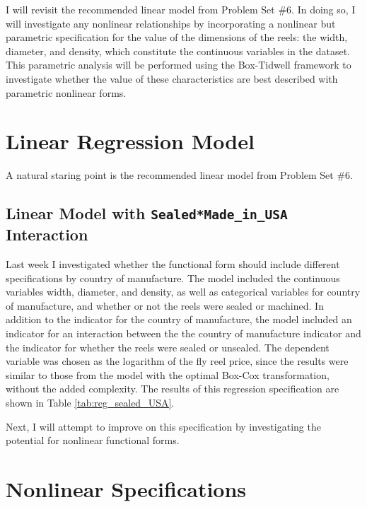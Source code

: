 \documentclass[11pt]{paper}
\begin{document}
I will revisit the recommended linear model
from Problem Set \#6. 
%
In doing so, I will investigate any nonlinear relationships
by incorporating a nonlinear but parametric specification
for the value of the dimensions of the reels:
the width, diameter, and density, 
which constitute the continuous variables in the dataset.
This parametric analysis will be performed
using the Box-Tidwell framework
to investigate whether the value of these characteristics
are best described with parametric nonlinear forms. 


\clearpage
\section{Linear Regression Model}

A natural staring point is the recommended linear model
from Problem Set \#6. 

\subsection{Linear Model with \texttt{Sealed*Made\_in\_USA} Interaction}

Last week I investigated whether 
the functional form should include different specifications by
country of manufacture.
% 
The model included the continuous variables 
width, diameter, and density, 
as well as categorical variables for 
country of manufacture, 
and whether or not the reels were sealed or machined. 
% 
In addition to the indicator for the country of manufacture, the model included an indicator for an interaction between
the the country of manufacture indicator and the indicator for whether the reels were sealed or unsealed. 
% 
The dependent variable was chosen as 
the logarithm of the fly reel price, 
since the results were similar to those from the model 
with the optimal Box-Cox transformation, 
without the added complexity. 
% 
The results of this regression specification are shown in 
Table \ref{tab:reg_sealed_USA}. 
% 

% 
Next, I will attempt to improve on this specification
by investigating the potential for nonlinear functional forms. 








\clearpage
\section{Nonlinear Specifications}
\end{document}
